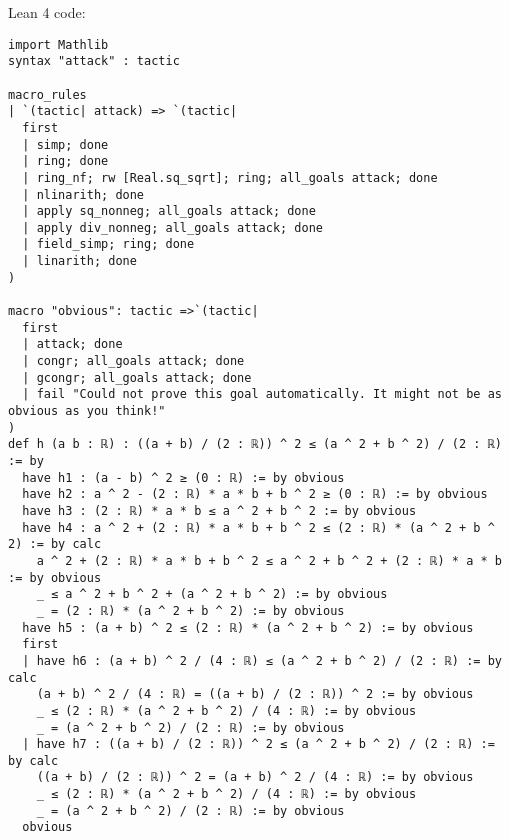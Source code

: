 \documentclass{article}
\begin{document}
Lean 4 code:
\begin{tcolorbox}[colback=white!10, width=\linewidth]
\begin{lstlisting}[language=Lean4]
import Mathlib
syntax "attack" : tactic

macro_rules
| `(tactic| attack) => `(tactic|
  first
  | simp; done
  | ring; done
  | ring_nf; rw [Real.sq_sqrt]; ring; all_goals attack; done
  | nlinarith; done
  | apply sq_nonneg; all_goals attack; done
  | apply div_nonneg; all_goals attack; done
  | field_simp; ring; done
  | linarith; done
)

macro "obvious": tactic =>`(tactic|
  first
  | attack; done
  | congr; all_goals attack; done
  | gcongr; all_goals attack; done
  | fail "Could not prove this goal automatically. It might not be as obvious as you think!"
)
def h (a b : ℝ) : ((a + b) / (2 : ℝ)) ^ 2 ≤ (a ^ 2 + b ^ 2) / (2 : ℝ) := by
  have h1 : (a - b) ^ 2 ≥ (0 : ℝ) := by obvious
  have h2 : a ^ 2 - (2 : ℝ) * a * b + b ^ 2 ≥ (0 : ℝ) := by obvious
  have h3 : (2 : ℝ) * a * b ≤ a ^ 2 + b ^ 2 := by obvious
  have h4 : a ^ 2 + (2 : ℝ) * a * b + b ^ 2 ≤ (2 : ℝ) * (a ^ 2 + b ^ 2) := by calc
    a ^ 2 + (2 : ℝ) * a * b + b ^ 2 ≤ a ^ 2 + b ^ 2 + (2 : ℝ) * a * b := by obvious
    _ ≤ a ^ 2 + b ^ 2 + (a ^ 2 + b ^ 2) := by obvious
    _ = (2 : ℝ) * (a ^ 2 + b ^ 2) := by obvious
  have h5 : (a + b) ^ 2 ≤ (2 : ℝ) * (a ^ 2 + b ^ 2) := by obvious
  first
  | have h6 : (a + b) ^ 2 / (4 : ℝ) ≤ (a ^ 2 + b ^ 2) / (2 : ℝ) := by calc
    (a + b) ^ 2 / (4 : ℝ) = ((a + b) / (2 : ℝ)) ^ 2 := by obvious
    _ ≤ (2 : ℝ) * (a ^ 2 + b ^ 2) / (4 : ℝ) := by obvious
    _ = (a ^ 2 + b ^ 2) / (2 : ℝ) := by obvious
  | have h7 : ((a + b) / (2 : ℝ)) ^ 2 ≤ (a ^ 2 + b ^ 2) / (2 : ℝ) := by calc
    ((a + b) / (2 : ℝ)) ^ 2 = (a + b) ^ 2 / (4 : ℝ) := by obvious
    _ ≤ (2 : ℝ) * (a ^ 2 + b ^ 2) / (4 : ℝ) := by obvious
    _ = (a ^ 2 + b ^ 2) / (2 : ℝ) := by obvious
  obvious

\end{lstlisting}
\end{tcolorbox}
\end{document}
